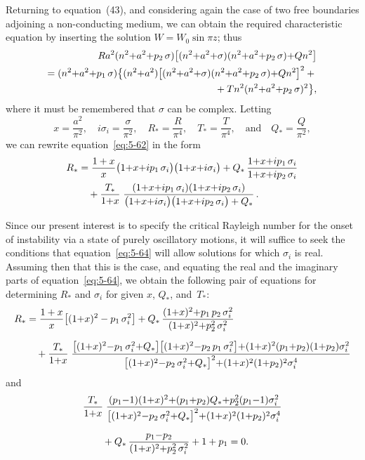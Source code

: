 Returning to equation~(43), and considering again the case of two free
boundaries adjoining a non-conducting medium, we can obtain the
required characteristic equation by inserting the solution $W = W_0 \sin \pi z$;
thus
\begin{align}
Ra^2(n^2{+}a^2{+}p_2\,\sigma)\bigl[(n^2{+}a^2{+}\sigma)(n^2{+}a^2{+}p_2\,\sigma){+}Qn^2\bigr]
\notag\\
= (n^2{+}a^2{+}p_1\,\sigma)\bigl\{(n^2{+}a^2)\bigl[(n^2{+}a^2{+}\sigma)(n^2{+}a^2{+}p_2\,\sigma){+}Qn^2\bigr]^2 +{} \notag\\
\qquad {}+ Tn^2(n^2{+}a^2{+}p_2\,\sigma)^2\bigr\},
\label{eq:5-62}
\end{align}
where it must be remembered that $\sigma$ can be complex. Letting
\begin{equation}
x = \frac{a^2}{\pi^2},\quad
i\sigma_i = \frac{\sigma}{\pi^2},\quad
R_* = \frac{R}{\pi^4},\quad
T_* = \frac{T}{\pi^4},\quad\text{and}\quad
Q_* = \frac{Q}{\pi^2},
\label{eq:5-63}
\end{equation}
we can rewrite equation~\eqref{eq:5-62} in the form
\begin{align}
R_* &= \frac{1+x}{x}\bigl(1{+}x{+}ip_1\,\sigma_i\bigr)\bigl(1{+}x{+}i\sigma_i\bigr)
+ Q_*\,\frac{1{+}x{+}ip_1\,\sigma_i}{1{+}x{+}ip_2\,\sigma_i}
\notag\\
&\quad{}+ \frac{T_*}{1{+}x}\;\frac{(1{+}x{+}ip_1\,\sigma_i)(1{+}x{+}ip_2\,\sigma_i)}
{\bigl(1{+}x{+}i\sigma_i\bigr)\bigl(1{+}x{+}ip_2\,\sigma_i\bigr)+Q_*}\,.
\label{eq:5-64}
\end{align}

Since our present interest is to specify the critical Rayleigh number
for the onset of instability via a state of purely oscillatory motions, it
will suffice to seek the conditions that equation~\eqref{eq:5-64} will allow solutions
for which $\sigma_i$ is real. Assuming then that this is the case, and equating
the real and the imaginary parts of equation~\eqref{eq:5-64}, we obtain the following
pair of equations for determining $R_*$ and $\sigma_i$ for given $x$, $Q_*$, and~$T_*$:
\begin{align}
R_* &= \frac{1+x}{x}\bigl[(1{+}x)^2 - p_1\,\sigma_i^2\bigr]
+ Q_*\,\frac{(1{+}x)^2{+}p_1\,p_2\,\sigma_i^2}{(1{+}x)^2{+}p_2^2\,\sigma_i^2}
\notag\\[6pt]
&\quad{}+ \frac{T_*}{1{+}x}\;\frac{\bigl[(1{+}x)^2{-}p_1\,\sigma_i^2{+}Q_*\bigr]\bigl[(1{+}x)^2{-}p_2\,p_1\,\sigma_i^2\bigr]
{+}(1{+}x)^2(p_1{+}p_2)(1{+}p_2)\sigma_i^2}
{\bigl[(1{+}x)^2{-}p_2\,\sigma_i^2{+}Q_*\bigr]^2{+}(1{+}x)^2(1{+}p_2)^2\sigma_i^4}
\label{eq:5-65}
\end{align}
and
\begin{align}
&\frac{T_*}{1{+}x}\;\frac{(p_1{-}1)(1{+}x)^2{+}(p_1{+}p_2)Q_*{+}p_2^2(p_1{-}1)\sigma_i^2}
{\bigl[(1{+}x)^2{-}p_2\,\sigma_i^2{+}Q_*\bigr]^2{+}(1{+}x)^2(1{+}p_2)^2\sigma_i^4}
\notag\\[6pt]
&\qquad{}+ Q_*\,\frac{p_1{-}p_2}{(1{+}x)^2{+}p_2^2\,\sigma_i^2}
+ 1 + p_1 = 0.
\label{eq:5-66}
\end{align}

